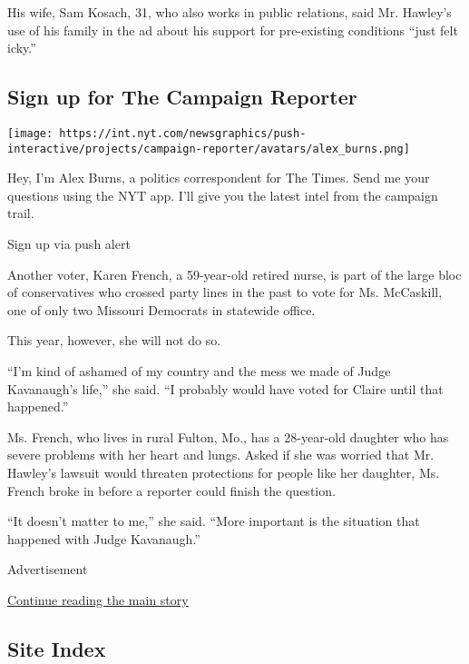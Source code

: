His wife, Sam Kosach, 31, who also works in public relations, said Mr.
Hawley's use of his family in the ad about his support for pre-existing
conditions ``just felt icky.''

\href{https://www.nytimes.com/interactive/2018/09/28/us/politics/the-campaign-reporter-ul.html?src=hpPromoHeadline}{}

\hypertarget{sign-up-for-the-campaign-reporter}{%
\subsection{Sign up for The Campaign
Reporter}\label{sign-up-for-the-campaign-reporter}}

\texttt{[image: https://int.nyt.com/newsgraphics/push-interactive/projects/campaign-reporter/avatars/alex\_burns.png]}

Hey, I'm Alex Burns, a politics correspondent for The Times. Send me
your questions using the NYT app. I'll give you the latest intel from
the campaign trail.

Sign up via push alert

Another voter, Karen French, a 59-year-old retired nurse, is part of the
large bloc of conservatives who crossed party lines in the past to vote
for Ms. McCaskill, one of only two Missouri Democrats in statewide
office.

This year, however, she will not do so.

``I'm kind of ashamed of my country and the mess we made of Judge
Kavanaugh's life,'' she said. ``I probably would have voted for Claire
until that happened.''

Ms. French, who lives in rural Fulton, Mo., has a 28-year-old daughter
who has severe problems with her heart and lungs. Asked if she was
worried that Mr. Hawley's lawsuit would threaten protections for people
like her daughter, Ms. French broke in before a reporter could finish
the question.

``It doesn't matter to me,'' she said. ``More important is the situation
that happened with Judge Kavanaugh.''

Advertisement

\protect\hyperlink{after-bottom}{Continue reading the main story}

\hypertarget{site-index}{%
\subsection{Site Index}\label{site-index}}

